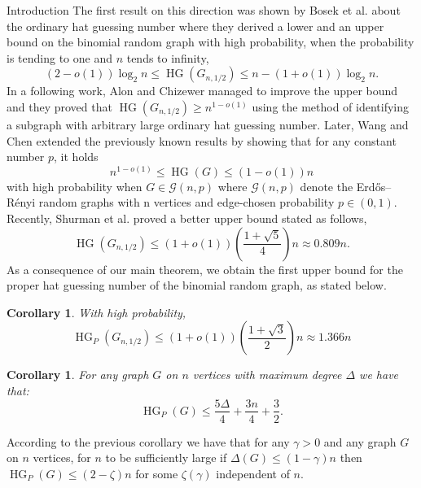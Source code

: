 \documentclass[11pt, letterpaper]{article}
\theoremstyle{plain}
\theoremstyle{plain}
\newtheorem{corollary}[theorem]{Corollary}
\begin{document}
\begin{section}{Introduction}
The first result on this direction was shown by Bosek et al. \cite{bosek2021hat} about the ordinary hat guessing number where they derived a lower and an upper bound on the binomial random graph with high probability, when the probability is tending to one and $n$ tends to infinity, 
$$(2-o(1))\log_{2}n \leq \operatorname{HG}(G_{n,1/2}) \leq n-(1+o(1))\log_{2}n.$$
In a following work, Alon and Chizewer \cite{alon2022hat} managed to improve the upper bound and they proved that $\operatorname{HG}(G_{n,1/2}) \geq n^{1-o(1)}$ using the method of identifying a subgraph with arbitrary large ordinary hat guessing number. Later, Wang and Chen \cite{wang2023hat} extended the previously known results by showing that for any constant number $p$, it holds
$$n^{1-o(1)} \leq \operatorname{HG}(G) \leq (1-o(1))n$$ with high probability when $G \in \mathcal{G}(n,p)$ where $\mathcal{G}(n,p)$  denote the Erd\H{o}s--R\'enyi random graphs with n vertices and edge-chosen
probability $p \in (0, 1)$.
Recently, Shurman et al. \cite{shurman2026upper} proved a better upper bound stated as follows, 
$$\operatorname{HG}(G_{n,1/2}) \leq (1+o(1))\left(\frac{1+\sqrt{5}}{4}\right)n \approx 0.809n.$$
As a consequence of our main theorem, we obtain the first upper bound for the proper hat guessing number of the binomial random graph, as stated below.
\vspace{1.5em}
\begin{corollary}\label{cor:G_n,1/2}
With high probability, 
$$\operatorname{HG}_{P}(G_{n,1/2}) \leq (1+o(1)) \left(\frac{1+\sqrt 3}{2}\right)n \approx 1.366n$$
\end{corollary}
\begin{corollary}\label{cor:epsilon_delta}
For any graph $G$ on $n$ vertices with maximum degree $\Delta$ we have that: 
$$\operatorname{HG}_{P}(G) \leq \frac{5\Delta}{4} + \frac{3n}{4} + \frac{3}{2}.$$
\end{corollary}
According to the previous corollary we have that for any $\gamma > 0$ and any graph $G$ on $n$ vertices, for $n$ to be sufficiently large if $\Delta(G) \leq (1-\gamma)n$ then $\operatorname{HG}_{P}(G) \leq (2-\zeta)n$ for some $\zeta(\gamma)$ independent of $n$. \\ 


\end{section}
\end{document}
